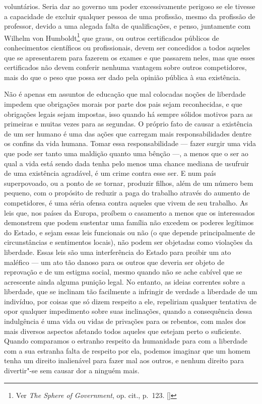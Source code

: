 voluntários. Seria dar ao governo um poder excessivamente perigoso se
ele tivesse a capacidade de excluir qualquer pessoa de uma profissão,
mesmo da profissão de professor, devido a uma alegada falta de
qualificações, e penso, juntamente com Wilhelm von
Humboldt\footnote{ Ver \textit{The Sphere of Government}, op. cit., p.~123. []}
 que graus, ou outros certificados públicos de conhecimentos científicos
ou profissionais, devem ser concedidos a todos aqueles que se
apresentarem para fazerem os exames e que passarem neles, mas que esses
certificados não devem conferir nenhuma vantagem sobre outros
competidores, mais do que o peso que possa ser dado pela opinião
pública à sua existência.

 Não é apenas em assuntos de educação que mal colocadas noções de
liberdade impedem que obrigações morais por parte dos pais sejam
reconhecidas, e que obrigações legais sejam impostas, isso quando há
sempre sólidos motivos para as primeiras e muitas vezes para as
segundas. O próprio fato de causar a existência de um ser humano é uma
das ações que carregam mais responsabilidades dentre os confins da vida
humana. Tomar essa responsabilidade --- fazer surgir uma vida que pode
ser tanto uma maldição quanto uma bênção ---, a menos que o ser ao qual
a vida está sendo dada tenha pelo menos uma chance mediana de usufruir
de uma existência agradável, é um crime contra esse ser. E num país
superpovoado, ou a ponto de se tornar, produzir filhos, além de um
número bem pequeno, com o propósito de reduzir a paga do trabalho
através do aumento de competidores, é uma séria ofensa contra aqueles
que vivem de seu trabalho. As leis que, nos países da Europa,
proíbem o casamento a menos que os interessados demonstrem que podem
sustentar uma família não excedem os poderes legítimos do Estado, e
sejam essas leis funcionais ou não (o que depende principalmente de
circunstâncias e sentimentos locais), não podem ser objetadas como
violações da liberdade. Essas leis são uma interferência do Estado para
proibir um ato maléfico --- um ato tão danoso para os outros que deveria
ser objeto de reprovação e de um estigma social, mesmo quando não se
ache cabível que se acrescente ainda alguma punição legal. No entanto,
as ideias correntes sobre a liberdade, que se inclinam tão facilmente a
infringir de verdade a \mbox{liberdade} de um \mbox{indivíduo}, por coisas que só
dizem respeito a ele, repeliriam qualquer tentativa de opor qualquer
impedimento sobre suas inclinações, quando a consequência dessa
indulgência é uma vida ou vidas de privações para os rebentos, com
males dos mais diversos aspectos afetando todos aqueles que estejam
perto o suficiente. Quando
comparamos o estranho respeito da humanidade para com a liberdade com a
sua estranha falta de respeito por ela, podemos imaginar que um homem
tenha um direito inalienável para fazer mal aos outros, e nenhum
direito para divertir"-se sem causar dor a ninguém mais. 

